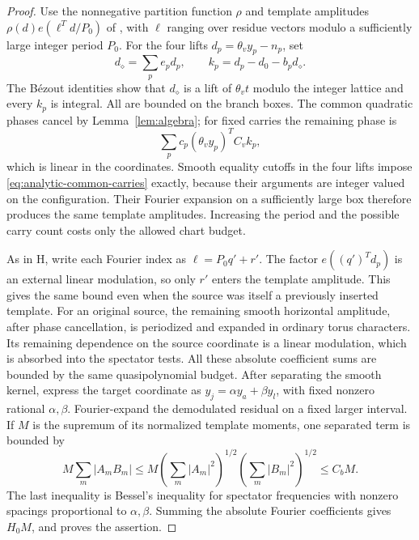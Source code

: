 \begin{proof}
Use the nonnegative partition function \(\rho\) and template
amplitudes \(\rho(d)e(\ell^Td/P_0)\) of
\cite[Lemma~6.6]{H}, with \(\ell\) ranging over residue vectors
modulo a sufficiently large integer period \(P_0\).  For the four
lifts \(d_p=\theta_vy_p-n_p\), set
\begin{equation}
 d_\diamond=\sum_pe_pd_p,\qquad
 k_p=d_p-d_0-b_pd_\diamond.
 \label{eq:analytic-common-carries}
\end{equation}
The B\'ezout identities show that \(d_\diamond\) is a lift of
\(\theta_vt\) modulo the integer lattice and every \(k_p\) is
integral.  All are bounded on the branch boxes.  The common
quadratic phases cancel by Lemma~\ref{lem:algebra}; for fixed
carries the remaining phase is
\[
 \sum_pc_p(\theta_vy_p)^TC_vk_p,
\]
which is linear in the coordinates.  Smooth equality cutoffs in
the four lifts impose \eqref{eq:analytic-common-carries} exactly,
because their arguments are integer valued on the configuration.
Their Fourier expansion on a sufficiently large box therefore
produces the same template amplitudes.  Increasing the period
and the possible carry count costs only the allowed chart budget.

As in H, write each Fourier index as \(\ell=P_0q'+r'\).
The factor \(e((q')^Td_p)\) is an external linear modulation,
so only \(r'\) enters the template amplitude.  This gives the
same bound even when the source was itself a previously inserted
template.  For an original source, the remaining smooth horizontal
amplitude, after phase cancellation, is periodized and expanded
in ordinary torus characters.  Its remaining dependence on the
source coordinate is a linear modulation, which is absorbed into
the spectator tests.  All these absolute coefficient sums are
bounded by the same quasipolynomial budget.
After separating the smooth kernel, express the target
coordinate as \(y_j=\alpha y_a+\beta y_l\), with fixed nonzero
rational \(\alpha,\beta\).  Fourier-expand the demodulated
residual on a fixed larger interval.  If \(M\) is the supremum
of its normalized template moments, one separated term is bounded
by
\[
 M\sum_m|A_mB_m|
 \le M\left(\sum_m|A_m|^2\right)^{1/2}
       \left(\sum_m|B_m|^2\right)^{1/2}
 \le C_bM.
\]
The last inequality is Bessel's inequality for spectator
frequencies with nonzero spacings proportional to
\(\alpha,\beta\).  Summing the absolute Fourier coefficients
gives \(H_0M\), and proves the assertion.
\end{proof}

